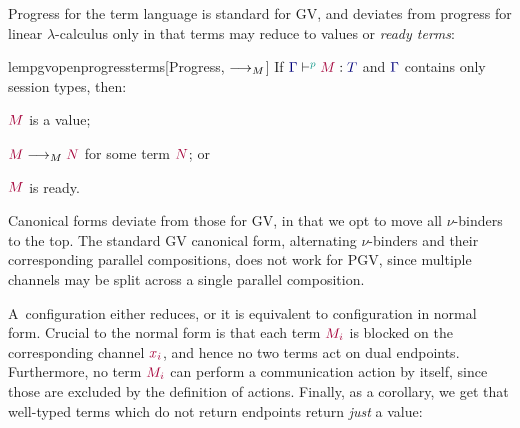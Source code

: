 \documentclass[main.tex]{subfiles}
\begin{document}
Progress for the term language is standard for GV, and deviates from progress for linear $\lambda$-calculus only in that terms may reduce to values or \emph{ready terms}:
\begin{restatablelemma}{lempgvopenprogressterms}[Progress, $\longrightarrow_{M}$]
  \label{lem:pgv-open-progress-terms}
  If $\tseq[\cs{p}]{\ty{\Gamma}}{M}{T}$ and $\ty{\Gamma}$ contains only session types, then:
  \begin{enumerate*}[label=\emph{(\alph*)}]
  \item $\tm{M}$ is a value;
  \item $\tm{M}\tred\tm{N}$ for some term $\tm{N}$; or
  \item $\tm{M}$ is ready.
  \end{enumerate*}
\end{restatablelemma}

Canonical forms deviate from those for GV, in that we opt to move all $\nu$-binders to the top. The standard GV canonical form, alternating $\nu$-binders and their corresponding parallel compositions, does not work for PGV, since multiple channels may be split across a single parallel composition.

A~configuration either reduces, or it is equivalent to configuration in normal form. Crucial to the normal form is that each term $\tm{M_i}$ is blocked on the corresponding channel $\tm{x_i}$, and hence no two terms act on dual endpoints. Furthermore, no term $\tm{M_i}$ can perform a communication action by itself, since those are excluded by the definition of actions.
Finally, as a corollary, we get that well-typed terms which do not return endpoints return \emph{just} a value:
\end{document}
